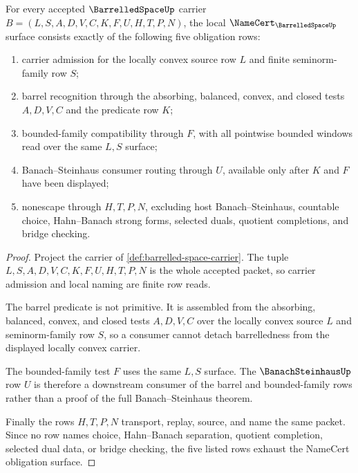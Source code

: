 \begin{theorem}
\label{thm:barrelled-space-obligation-surface}
For every accepted $\BarrelledSpaceUp$ carrier $B=(L,S,A,D,V,C,K,F,U,H,T,P,N)$, the local $\NameCert_{\BarrelledSpaceUp}$ surface consists exactly of the following five obligation rows:
\begin{enumerate}
\item carrier admission for the locally convex source row $L$ and finite seminorm-family row $S$;
\item barrel recognition through the absorbing, balanced, convex, and closed tests $A,D,V,C$ and the predicate row $K$;
\item bounded-family compatibility through $F$, with all pointwise bounded windows read over the same $L,S$ surface;
\item Banach--Steinhaus consumer routing through $U$, available only after $K$ and $F$ have been displayed;
\item nonescape through $H,T,P,N$, excluding host Banach--Steinhaus, countable choice, Hahn--Banach strong forms, selected duals, quotient completions, and bridge checking.
\end{enumerate}
\end{theorem}
\begin{proof}
Project the carrier of \autoref{def:barrelled-space-carrier}. The tuple $L,S,A,D,V,C,K,F,U,H,T,P,N$ is the whole accepted packet, so carrier admission and local naming are finite row reads.

The barrel predicate is not primitive. It is assembled from the absorbing, balanced, convex, and closed tests $A,D,V,C$ over the locally convex source $L$ and seminorm-family row $S$, so a consumer cannot detach barrelledness from the displayed locally convex carrier.

The bounded-family test $F$ uses the same $L,S$ surface. The $\BanachSteinhausUp$ row $U$ is therefore a downstream consumer of the barrel and bounded-family rows rather than a proof of the full Banach--Steinhaus theorem.

Finally the rows $H,T,P,N$ transport, replay, source, and name the same packet. Since no row names choice, Hahn--Banach separation, quotient completion, selected dual data, or bridge checking, the five listed rows exhaust the NameCert obligation surface.
\end{proof}


